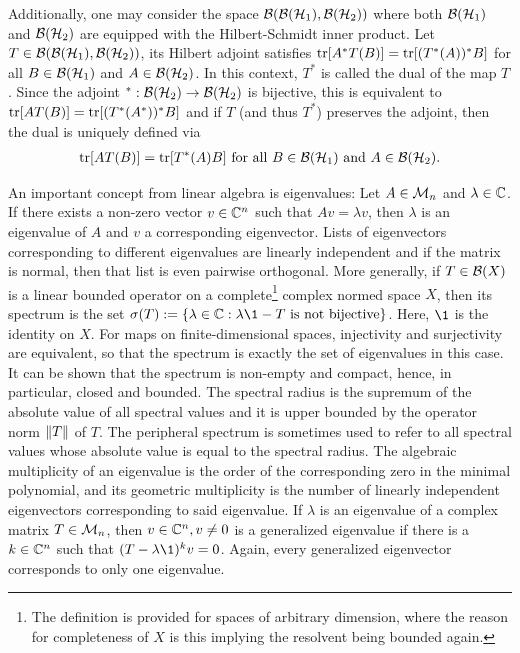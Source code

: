 Additionally, one may consider the space $\mathcal B(\mathcal B(\mathcal{H}_1),\mathcal B(\mathcal{H}_2))$ where both $\mathcal B(\mathcal{H}_1)$ and $\mathcal B(\mathcal{H}_2)$ are equipped with the Hilbert-Schmidt inner product. Let $T \in \mathcal B(\mathcal B(\mathcal{H}_1),\mathcal B(\mathcal{H}_2)) $, its Hilbert adjoint satisfies $\mathrm{tr}[A^* T(B)] = \mathrm{tr}[(T^*(A))^*B]$ for all $B \in \mathcal B(\mathcal{H}_1)$ and $A \in \mathcal B(\mathcal{H}_2)$. In this context, $T^*$ is called the dual of the map $T$. Since the adjoint $^*:\mathcal B(\mathcal{H}_2) \rightarrow \mathcal B(\mathcal{H}_2)$ is bijective, this is equivalent to $\mathrm{tr}[A T(B)] = \mathrm{tr}[(T^*(A^*))^*B]$ and if $T$ (and thus $T^*$) preserves the adjoint, then the dual is uniquely defined via
\begin{align}
    \mathrm{tr}[A T(B)] = \mathrm{tr}[T^*(A)B] \text{ for all }B \in \mathcal B(\mathcal{H}_1)\text{ and }A \in \mathcal B(\mathcal{H}_2).
\end{align}

An important concept from linear algebra is eigenvalues: Let $A \in \mathcal M_n$ and $\lambda \in \mathbb{C}$. If there exists a non-zero vector $v \in \mathbb{C}^n$ such that $Av = \lambda v$, then $\lambda$ is an eigenvalue of $A$ and $v$ a corresponding eigenvector. Lists of eigenvectors corresponding to different eigenvalues are linearly independent and if the matrix is normal, then that list is even pairwise orthogonal. More generally, if $T \in \mathcal B(X)$ is a linear bounded operator on a complete\footnote{The definition is provided for spaces of arbitrary dimension, where the reason for completeness of $X$ is this implying the resolvent being bounded again.} complex normed space $X$, then its spectrum is the set $\sigma(T):=\{\lambda \in \C: \lambda \1 - T \text{ is not bijective}\}$. Here, $\1$ is the identity on $X$. For maps on finite-dimensional spaces, injectivity and surjectivity are equivalent, so that the spectrum is exactly the set of eigenvalues in this case. It can be shown that the spectrum is non-empty and compact, hence, in particular, closed and bounded. The spectral radius is the supremum of the absolute value of all spectral values and it is upper bounded by the operator norm $\lVert T\rVert$ of $T$. The peripheral spectrum is sometimes used to refer to all spectral values whose absolute value is equal to the spectral radius. The algebraic multiplicity of an eigenvalue is the order of the corresponding zero in the minimal polynomial, and its geometric multiplicity is the number of linearly independent eigenvectors corresponding to said eigenvalue. If $\lambda$ is an eigenvalue of a complex matrix $T\in \mathcal M_n$, then $v\in \mathbb{C}^n, v\neq 0$ is a generalized eigenvalue if there is a $k\in \mathbb{C}^n $ such that $(T-\lambda \1)^k v = 0$. Again, every generalized eigenvector corresponds to only one eigenvalue.

